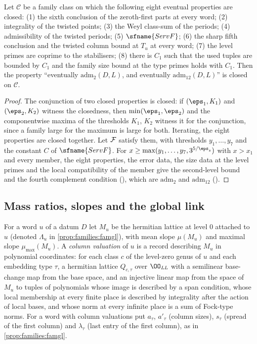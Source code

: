 \begin{proposition}\label{pf:top-shape:adminc}
Let $\mathcal C$ be a family class on which the following eight eventual properties are closed: (1) the sixth
conclusion of the zeroth-first parts at every word; (2) integrality of the twisted points; (3) the Weyl class-sum of
the periods; (4) admissibility of the twisted periods; (5) $\sfname{ServF}$; (6) the sharp fifth conclusion and the
twisted column bound at $T_u$ at every word; (7) the level primes are coprime to the stabilisers; (8) there is $C_1$
such that the used tuples are bounded by $C_1$ and the family size bound at the type primes holds with $C_1$. Then the
property ``eventually $\mathrm{adm}_2(D,L)$, and eventually $\mathrm{adm}_{12}(D,L)$'' is closed on $\mathcal C$.
\end{proposition}

\begin{proof}
The conjunction of two closed properties is closed: if $(\eps_1,K_1)$ and $(\eps_2,K_2)$ witness the closedness, then
$\min(\eps_1,\eps_2)$ and the componentwise maxima of the thresholds $K_1$, $K_2$ witness it for the conjunction,
since a family large for the maximum is large for both. Iterating, the eight properties are closed together. Let
$\mathcal{F}$ satisfy them, with thresholds $y_1,\dots,y_7$ and the constant $C$ of $\sfname{ServF}$. For
$x\ge\max(y_1,\dots,y_7,3^{5/\eps_z})$ with $x>x_1$ and every member, the eight properties, the error data, the size
data at the level primes and the local compatibility of the member give the second-level bound and the fourth
complement condition (), which are $\mathrm{adm}_2$ and
$\mathrm{adm}_{12}$ ().
\end{proof}

\subsection{Mass ratios, slopes and the global link}\label{sec:pf:top-shape:gl}

For a word $u$ of a datum $D$ let $M_u$ be the hermitian lattice at level $0$ attached to $u$ (denoted $\Lambda_u$ in
\cref{prop:families:famgl}), with mean slope $\mu(M_u)$ and maximal slope $\mu_{\max}(M_u)$. A \emph{column valuation}
of $u$ is a record describing $M_u$ in polynomial coordinates: for each class $c$ of the level-zero genus of $u$ and
each embedding type $\tau$, a hermitian lattice $Q_{c,\tau}$ over $\OO_{\mathit{LL}}$ with a semilinear base-change map
from the base space, and an injective linear map from the space of $M_u$ to tuples of polynomials whose image is
described by a span condition, whose local membership at every finite place is described by integrality after the
action of local bases, and whose norm at every infinite place is a sum of Fock-type norms. For a word with column
valuations put $a_\tau$, $a'_\tau$ (column sizes), $s_\tau$ (spread of the first column) and $\lambda_\tau$ (last entry
of the first column), as in \cref{prop:families:famgl}.


